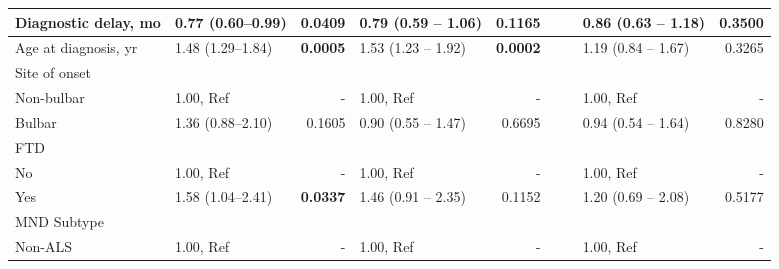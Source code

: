 \begin{sidewaystable}
{\begin{tabular}{|l|lr|lr|lr|lr|}
\hline
Diagnostic delay, mo & 0.77 (0.60--0.99) & \textbf{0.0409} & \textcolor[rgb]{0.2,0.2,0.2}{0.79 (0.59 -- 1.06)} & \textcolor[rgb]{0.2,0.2,0.2}{0.1165} & {\cellcolor[rgb]{0.753,0.753,0.753}} & {\cellcolor[rgb]{0.753,0.753,0.753}} & \textcolor[rgb]{0.2,0.2,0.2}{0.86 (0.63 -- 1.18)} & \textcolor[rgb]{0.2,0.2,0.2}{0.3500} \\ 
\hline
Age at diagnosis, yr & 1.48 (1.29--1.84) & \textbf{0.0005} & \textcolor[rgb]{0.2,0.2,0.2}{1.53 (1.23 -- 1.92)} & \textcolor[rgb]{0.2,0.2,0.2}{\textbf{0.0002}} & {\cellcolor[rgb]{0.753,0.753,0.753}} & {\cellcolor[rgb]{0.753,0.753,0.753}} & \textcolor[rgb]{0.2,0.2,0.2}{1.19 (0.84 -- 1.67)} & \textcolor[rgb]{0.2,0.2,0.2}{0.3265} \\ 
\hline
Site of onset &  &  &  &  & {\cellcolor[rgb]{0.753,0.753,0.753}} & {\cellcolor[rgb]{0.753,0.753,0.753}} &  &  \\
\hspace{5mm}Non-bulbar & 1.00, Ref & - & 1.00, Ref & - & {\cellcolor[rgb]{0.753,0.753,0.753}} & {\cellcolor[rgb]{0.753,0.753,0.753}} & 1.00, Ref & - \\
\hspace{5mm}Bulbar & 1.36 (0.88--2.10) & 0.1605 & \textcolor[rgb]{0.2,0.2,0.2}{0.90 (0.55 -- 1.47)} & \textcolor[rgb]{0.2,0.2,0.2}{0.6695} & {\cellcolor[rgb]{0.753,0.753,0.753}} & {\cellcolor[rgb]{0.753,0.753,0.753}} & \textcolor[rgb]{0.2,0.2,0.2}{0.94 (0.54 -- 1.64)} & \textcolor[rgb]{0.2,0.2,0.2}{0.8280} \\ 
\hline
FTD &  &  &  &  & {\cellcolor[rgb]{0.753,0.753,0.753}} & {\cellcolor[rgb]{0.753,0.753,0.753}} &  &  \\
\hspace{5mm}No & 1.00, Ref & - & 1.00, Ref & - & {\cellcolor[rgb]{0.753,0.753,0.753}} & {\cellcolor[rgb]{0.753,0.753,0.753}} & 1.00, Ref & - \\
\hspace{5mm}Yes & 1.58 (1.04--2.41) & \textbf{0.0337} & \textcolor[rgb]{0.2,0.2,0.2}{1.46 (0.91 -- 2.35)} & \textcolor[rgb]{0.2,0.2,0.2}{0.1152} & {\cellcolor[rgb]{0.753,0.753,0.753}} & {\cellcolor[rgb]{0.753,0.753,0.753}} & \textcolor[rgb]{0.2,0.2,0.2}{1.20 (0.69 -- 2.08)} & \textcolor[rgb]{0.2,0.2,0.2}{0.5177} \\ 
\hline
MND Subtype &  &  &  &  & {\cellcolor[rgb]{0.753,0.753,0.753}} & {\cellcolor[rgb]{0.753,0.753,0.753}} &  &  \\
\hspace{5mm}Non-ALS & 1.00, Ref & - & 1.00, Ref & - & {\cellcolor[rgb]{0.753,0.753,0.753}} & {\cellcolor[rgb]{0.753,0.753,0.753}} & 1.00, Ref & - \\

\end{tabular}}
\end{sidewaystable}
